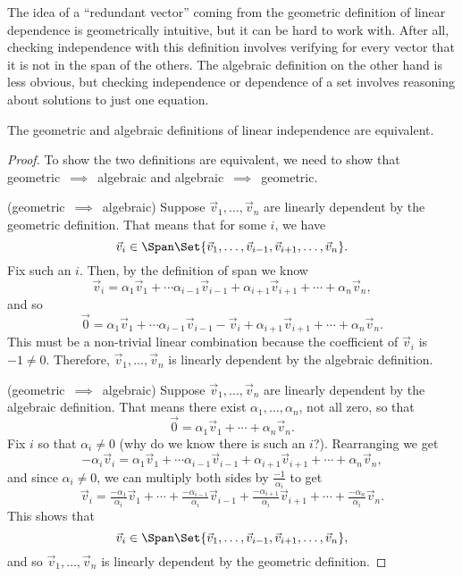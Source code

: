 The idea of a ``redundant vector'' coming from the geometric definition of linear dependence
is geometrically intuitive, but it can be hard to work with. After all, checking independence
with this definition involves verifying for every vector that it is not in the span of the others.
The algebraic definition on the other hand is less obvious, but checking independence or dependence
of a set involves reasoning about solutions to just one equation.

\begin{theorem}
	The geometric and algebraic definitions of linear independence are equivalent.
\end{theorem}
\begin{proof}
	To show the two definitions are equivalent, we need to show that geometric~$\implies$~algebraic
	and algebraic~$\implies$~geometric.

	\medskip
	\noindent
	(geometric~$\implies$~algebraic) Suppose $\vec v_1,\ldots,\vec v_n$ are linearly dependent by the 
	geometric definition. That means that for some $i$, we have
	\[
		\vec v_i \in \Span\Set{\vec v_1,\ldots,\vec v_{i-1},\vec v_{i+1},\ldots,\vec v_n}.
	\]
	Fix such an $i$. Then, by the definition of span we know
	\[
		\vec v_i=\alpha_1\vec v_1+\cdots \alpha_{i-1}\vec v_{i-1}+\alpha_{i+1}\vec v_{i+1}+\cdots +\alpha_n\vec v_n,
	\]
	and so
	\[
		\vec 0=\alpha_1\vec v_1+\cdots \alpha_{i-1}\vec v_{i-1}-\vec v_i+\alpha_{i+1}\vec v_{i+1}+\cdots +\alpha_n\vec v_n.
	\]
	This must be a non-trivial linear combination because the coefficient of $\vec v_i$ is $-1\neq 0$. Therefore, 
	$\vec v_1,\ldots,\vec v_n$ is linearly dependent by the algebraic definition.
	
	\medskip
	\noindent
	(geometric~$\implies$~algebraic) Suppose $\vec v_1,\ldots,\vec v_n$ are linearly dependent by the 
	algebraic definition. That means there exist $\alpha_1,\ldots,\alpha_n$, not all zero, so that
	\[
		\vec 0=\alpha_1\vec v_1+\cdots +\alpha_n\vec v_n.
	\]
	Fix $i$ so that $\alpha_i\neq 0$ (why do we know there is such an $i$?). Rearranging we get
	\[
		-\alpha_i\vec v_i=\alpha_1\vec v_1+\cdots \alpha_{i-1}\vec v_{i-1}+\alpha_{i+1}\vec v_{i+1}+\cdots +\alpha_n\vec v_n,
	\]
	and since $\alpha_i\neq 0$, we can multiply both sides by $\frac{-1}{\alpha_i}$ to get
	\[
		\vec v_i=\tfrac{-\alpha_1}{\alpha_i}\vec v_1+\cdots +\tfrac{-\alpha_{i-1}}{\alpha_i}\vec v_{i-1}
	+\tfrac{-\alpha_{i+1}}{\alpha_i}\vec v_{i+1}+\cdots +\tfrac{-\alpha_n}{\alpha_i}\vec v_n.
	\]
	This shows that
	\[
		\vec v_i \in \Span\Set{\vec v_1,\ldots,\vec v_{i-1},\vec v_{i+1},\ldots,\vec v_n},
	\]
	and so $\vec v_1,\ldots,\vec v_n$ is linearly dependent by the geometric definition.
\end{proof}


